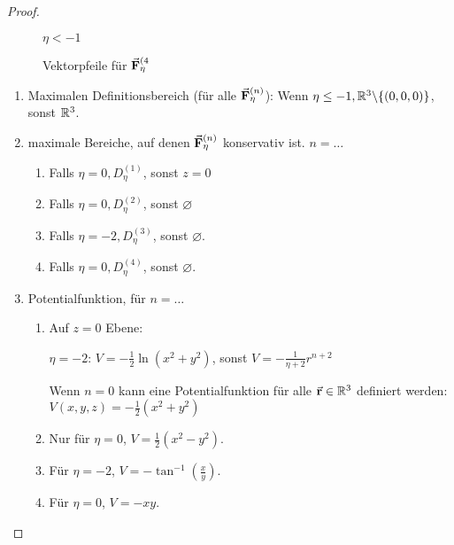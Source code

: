 \begin{proof}
\begin{figure}[h!]
\begin{subcaptionbox}{$\eta<-1$}
		{}
	\end{subcaptionbox}
	\caption{Vektorpfeile f\"{u}r $\va F_\eta^{(4}$}
\end{figure}
\begin{enumerate}
	\item Maximalen Definitionsbereich (f\"{u}r alle $\va F_\eta^{(n)}$): Wenn $\eta\le -1, \mathbb{R}^3\backslash \{(0,0,0)\}$, sonst $\mathbb{R}^3$.
	\item maximale Bereiche, auf denen $\va F_\eta^{(n)}$ konservativ ist. $n=\dots$
	\begin{enumerate}[label=(\arabic*)]
		\item Falls $\eta=0,D_\eta^{(1)}$, sonst $z=0$
		\item Falls $\eta=0, D_\eta^{(2)}$, sonst $\varnothing$
		\item Falls $\eta=-2, D_\eta^{(3)}$, sonst $\varnothing$.
		\item Falls $\eta=0, D_\eta^{(4)}$, sonst $\varnothing$.
	\end{enumerate}
	\item Potentialfunktion, f\"{u}r $n=\dots$
	\begin{enumerate}[label=(\arabic*)]
		\item Auf $z=0$ Ebene:
		
		$\eta=-2$: $V=-\frac 12\ln\left(x^2+y^2\right)$, sonst $V=-\frac 1{\eta+2}r^{n+2}$

		Wenn $n=0$ kann eine Potentialfunktion f\"{u}r alle $\va r\in\mathbb{R}^3$ definiert werden: $V(x,y,z)=-\frac{1}{2}\left( x^2+y^2 \right) $

	\item Nur f\"{u}r $\eta=0$, $V=\frac{1}{2}\left( x^2-y^2 \right) $.
	\item F\"{u}r $\eta=-2$, $V=-\tan^{-1}\left( \frac{x}{y} \right) $.

	\item F\"{u}r $\eta=0$, $V=-xy$.
	\end{enumerate}
\end{enumerate}
\end{proof}
